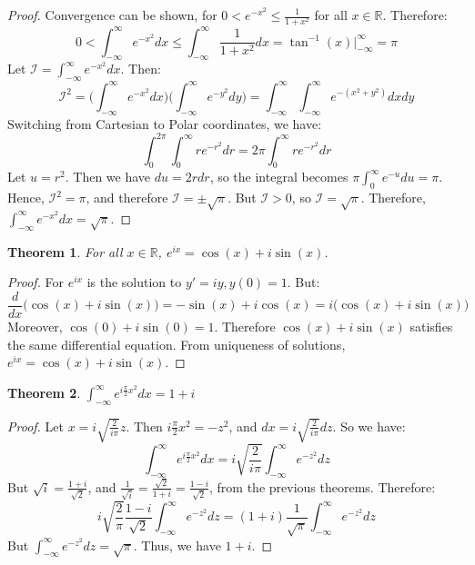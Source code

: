 \documentclass{article}
\theoremstyle{mystyle}
\newtheorem{theorem}{Theorem}[section]
\begin{document}
\begin{proof}
Convergence can be shown, for $0 < e^{-x^2} \leq \frac{1}{1+x^2}$ for all $x\in \mathbb{R}$. Therefore:
\begin{equation*}
0<\int_{-\infty}^{\infty} e^{-x^2}dx \leq \int_{-\infty}^{\infty} \frac{1}{1+x^2}dx = \tan^{-1}(x)\big|_{-\infty}^{\infty} = \pi
\end{equation*}
Let $\mathcal{I} = \int_{-\infty}^{\infty} e^{-x^2}dx$. Then:
\begin{equation*}
    \mathcal{I}^2 = \bigg(\int_{-\infty}^{\infty}e^{-x^2}dx\bigg)\bigg(\int_{-\infty}^{\infty}e^{-y^2}dy\bigg) = \int_{-\infty}^{\infty}\int_{-\infty}^{\infty}e^{-(x^2+y^2)}dxdy
\end{equation*}
Switching from Cartesian to Polar coordinates, we have:
\begin{equation*}
    \int_{0}^{2\pi}\int_{0}^{\infty} re^{-r^2}dr = 2\pi \int_{0}^{\infty}re^{-r^2}dr
\end{equation*}
Let $u = r^2$. Then we have $du = 2rdr$, so the integral becomes $\pi \int_{0}^{\infty} e^{-u}du = \pi$. Hence, $\mathcal{I}^2 = \pi$, and therefore $\mathcal{I} = \pm \sqrt{\pi}$. But $\mathcal{I} > 0$, so $\mathcal{I} = \sqrt{\pi}$. Therefore, $\int_{-\infty}^{\infty}e^{-x^2}dx = \sqrt{\pi}$. 
\end{proof}
\begin{theorem}
For all $x\in \mathbb{R}$, $e^{ix} = \cos(x)+i\sin(x)$.
\end{theorem}
\begin{proof}
For $e^{ix}$ is the solution to $y' = iy, y(0) = 1$. But:
\begin{equation*}
    \frac{d}{dx}\big(\cos(x)+i\sin(x)\big) = -\sin(x)+i\cos(x) = i\big(\cos(x)+i\sin(x)\big)
\end{equation*}
Moreover, $\cos(0)+i\sin(0) = 1$. Therefore $\cos(x)+i\sin(x)$ satisfies the same differential equation. From uniqueness of solutions, $e^{ix} = \cos(x)+i\sin(x)$.
\end{proof}
\begin{theorem}
$\int_{-\infty}^{\infty} e^{i\frac{\pi}{2}x^2}dx = 1+i$
\end{theorem}
\begin{proof}
Let $x = i\sqrt{\frac{2}{i\pi}}z$. Then $i\frac{\pi}{2}x^2 = -z^2$, and $dx = i\sqrt{\frac{2}{i\pi}}dz$. So we have:
\begin{equation*}
    \int_{-\infty}^{\infty}e^{i\frac{\pi}{2}x^2}dx = i\sqrt{\frac{2}{i\pi}}\int_{-\infty}^{\infty} e^{-z^2}dz    
\end{equation*}
But $\sqrt{i} = \frac{1+i}{\sqrt{2}}$, and $\frac{1}{\sqrt{i}} = \frac{\sqrt{2}}{1+i} = \frac{1-i}{\sqrt{2}}$, from the previous theorems. Therefore:
\begin{equation*}
    i\sqrt{\frac{2}{\pi}}\frac{1-i}{\sqrt{2}}\int_{-\infty}^{\infty}e^{-z^2}dz = (1+i)\frac{1}{\sqrt{\pi}}\int_{-\infty}^{\infty}e^{-z^2}dz
\end{equation*}
But $\int_{-\infty}^{\infty}e^{-z^2}dz = \sqrt{\pi}$. Thus, we have $1+i$.
\end{proof}
\end{document}
